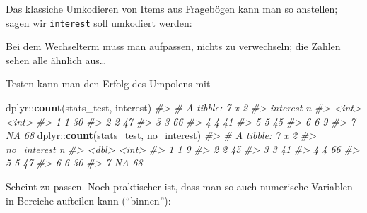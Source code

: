 \documentclass[12pt,ngerman,]{book}
\makeatletter
\newenvironment{Shaded}{\begin{snugshade}}{\end{snugshade}}
\newcommand{\KeywordTok}[1]{\textcolor[rgb]{0.13,0.29,0.53}{\textbf{{#1}}}}
\newcommand{\StringTok}[1]{\textcolor[rgb]{0.31,0.60,0.02}{{#1}}}
\newcommand{\CommentTok}[1]{\textcolor[rgb]{0.56,0.35,0.01}{\textit{{#1}}}}
\newcommand{\NormalTok}[1]{{#1}}
\newenvironment{kframe}{%
\medskip{}
\setlength{\fboxsep}{.8em}
 \def\at@end@of@kframe{}%
 \ifinner\ifhmode%
  \def\at@end@of@kframe{\end{minipage}}%
  \begin{minipage}{\columnwidth}%
 \fi\fi%
 \def\FrameCommand##1{\hskip\@totalleftmargin \hskip-\fboxsep
 \colorbox{shadecolor}{##1}\hskip-\fboxsep
     \hskip-\linewidth \hskip-\@totalleftmargin \hskip\columnwidth}%
 \MakeFramed {\advance\hsize-\width
   \@totalleftmargin\z@ \linewidth\hsize
   \@setminipage}}%
 {\par\unskip\endMakeFramed%
 \at@end@of@kframe}
\renewenvironment{Shaded}{\begin{kframe}}{\end{kframe}}
\makeatother
\begin{document}
Das klassiche Umkodieren von Items aus Fragebögen kann man so anstellen;
sagen wir \texttt{interest} soll umkodiert werden:

\begin{Shaded}
\end{Shaded}

Bei dem Wechselterm muss man aufpassen, nichts zu verwechseln; die
Zahlen sehen alle ähnlich aus\ldots{}

Testen kann man den Erfolg des Umpolens mit

\begin{Shaded}
\begin{Highlighting}[]
\NormalTok{dplyr::}\KeywordTok{count}\NormalTok{(stats_test, interest)}
\CommentTok{#> # A tibble: 7 x 2}
\CommentTok{#>   interest     n}
\CommentTok{#>      <int> <int>}
\CommentTok{#> 1        1    30}
\CommentTok{#> 2        2    47}
\CommentTok{#> 3        3    66}
\CommentTok{#> 4        4    41}
\CommentTok{#> 5        5    45}
\CommentTok{#> 6        6     9}
\CommentTok{#> 7       NA    68}
\NormalTok{dplyr::}\KeywordTok{count}\NormalTok{(stats_test, no_interest)}
\CommentTok{#> # A tibble: 7 x 2}
\CommentTok{#>   no_interest     n}
\CommentTok{#>         <dbl> <int>}
\CommentTok{#> 1           1     9}
\CommentTok{#> 2           2    45}
\CommentTok{#> 3           3    41}
\CommentTok{#> 4           4    66}
\CommentTok{#> 5           5    47}
\CommentTok{#> 6           6    30}
\CommentTok{#> 7          NA    68}
\end{Highlighting}
\end{Shaded}

Scheint zu passen. Noch praktischer ist, dass man so auch numerische
Variablen in Bereiche aufteilen kann (``binnen''):

\begin{Shaded}
\end{Shaded}
\end{document}

